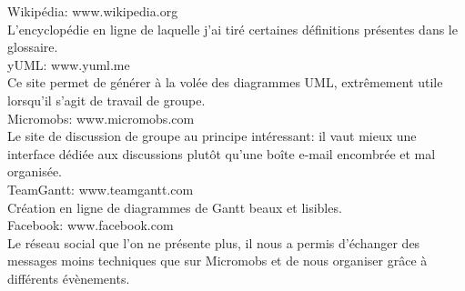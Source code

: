 \documentclass[a4paper, 12pt]{report}
\begin{document}
	\begin{thebibliography}{2}
		\label{sitographie}
		Wikipédia: www.wikipedia.org \\
		L'encyclopédie en ligne de laquelle j'ai tiré certaines définitions présentes dans le glossaire.
		~\\
		yUML: www.yuml.me \\
		Ce site permet de générer à la volée des diagrammes \gls{UML}, extrêmement utile lorsqu'il s'agit de travail de groupe.
		~\\
		Micromobs: www.micromobs.com \\
		Le site de discussion de groupe au principe intéressant: il vaut mieux une interface dédiée aux discussions plutôt
		qu'une boîte e-mail encombrée et mal organisée.
		~\\
		TeamGantt: www.teamgantt.com \\
		Création en ligne de diagrammes de Gantt beaux et lisibles.
		~\\
		Facebook: www.facebook.com \\
		Le réseau social que l'on ne présente plus, il nous a permis d'échanger des messages moins techniques que sur Micromobs
		et de nous organiser grâce à différents évènements.
	\end{thebibliography}
\end{document}
